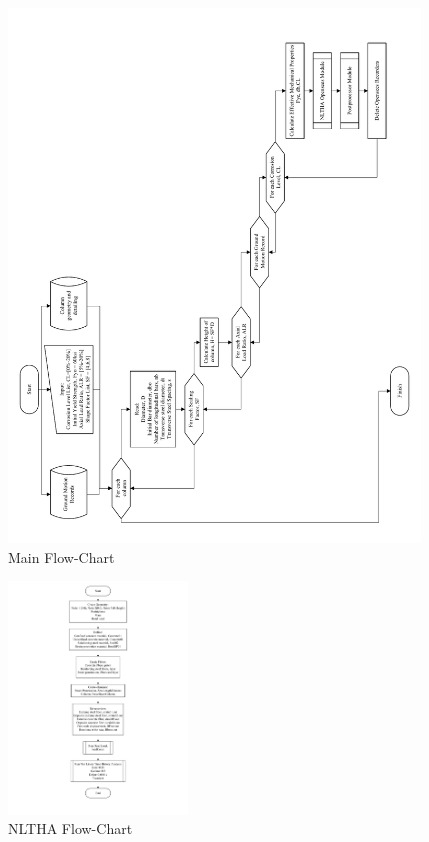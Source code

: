 \begin{figure}[htp]
	\centering
	\includegraphics[width=0.975\textwidth]{VAC Thesis 2.0/Chapter-5/figs/Main_FlowChart_01.pdf}
	\caption{Main Flow-Chart}
	\label{fig:main_flowchart}
\end{figure}

\begin{figure}[htp]
	\centering
	\includegraphics[width=0.425\textwidth]{VAC Thesis 2.0/Chapter-5/figs/NLTHA_FlowCharts_01.pdf}
	\caption{NLTHA Flow-Chart}
	\label{fig:nltha_flowchart}
\end{figure}

